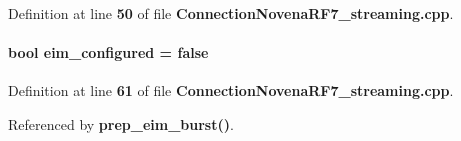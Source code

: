 Definition at line {\bf 50} of file {\bf Connection\+Novena\+R\+F7\+\_\+streaming.\+cpp}.

\paragraph[{eim\+\_\+configured}]{\setlength{\rightskip}{0pt plus 5cm}bool eim\+\_\+configured = false}\label{ConnectionNovenaRF7__streaming_8cpp_a1c181b5f0c4a7bc638cba14f498f457f}


Definition at line {\bf 61} of file {\bf Connection\+Novena\+R\+F7\+\_\+streaming.\+cpp}.



Referenced by {\bf prep\+\_\+eim\+\_\+burst()}.

